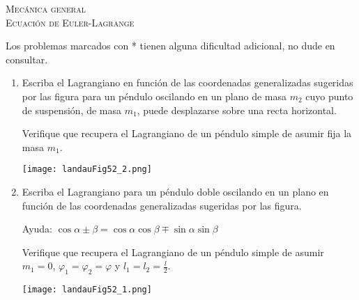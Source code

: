 \documentclass[11pt,spanish,a4paper]{article}
\begin{document}
\begin{center}
  \textsc{\large Mecánica general}\\
  \textsc{\large Ecuación de Euler-Lagrange}
\end{center}

\noindent
Los problemas marcados con * tienen alguna dificultad adicional, no dude en consultar.
\begin{enumerate}

\item \begin{minipage}[t][3cm]{0.7\textwidth}
Escriba el Lagrangiano en función de las coordenadas generalizadas sugeridas por las figura para un péndulo oscilando en un plano de masa \(m_2\) cuyo punto de suspensión, de masa \(m_1\), puede desplazarse sobre una recta horizontal.

Verifique que recupera el Lagrangiano de un péndulo simple de asumir fija la masa \(m_1\).
\end{minipage}
	\begin{minipage}[c][1em][t]{0.3\textwidth}
        \texttt{[image: landauFig52\_2.png]}
    \end{minipage}


\item \begin{minipage}[t][4.5cm]{0.7\textwidth}
Escriba el Lagrangiano para un péndulo doble oscilando en un plano en función de las coordenadas generalizadas sugeridas por las figura.

Ayuda: \( \cos{\alpha \pm \beta }=\cos{ \alpha} \cos{ \beta \mp \sin \alpha} \sin{ \beta } \)

Verifique que recupera el Lagrangiano de un péndulo simple de asumir \(m_1=0\), \(\varphi_1 = \varphi_2 = \varphi\) y \(l_1 = l_2 = \frac{l}{2}\).
\end{minipage}
	\begin{minipage}[c][1em][t]{0.3\textwidth}
        \texttt{[image: landauFig52\_1.png]}
    \end{minipage}


\end{enumerate}
\end{document}
